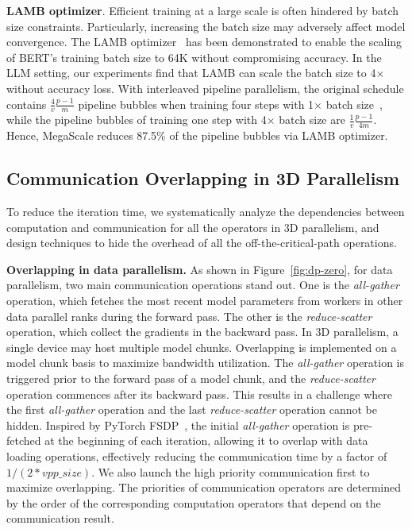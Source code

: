 \documentclass[letterpaper,twocolumn,10pt]{article}
\newcommand{\parabf}[1]{\medskip\noindent\textbf{#1}}
\newcommand{\sysname}{MegaScale\xspace}
\begin{document}
\parabf{LAMB optimizer}. Efficient training at a large scale is often
hindered by batch size constraints. Particularly, increasing the batch size may
adversely affect model convergence. The LAMB optimizer~\cite{You2020Large} has been
demonstrated to enable the scaling of BERT's training batch size to 64K without
compromising accuracy. In the LLM setting, our experiments find that LAMB
can scale the batch size to 4$\times$ without accuracy loss. With
interleaved pipeline parallelism, the original schedule contains $\frac{4}{v}
\frac{p-1}{m}$ pipeline bubbles when training four steps with 1$\times$ batch
size~\cite{narayanan2021efficient}, while the pipeline bubbles of training one
step with 4$\times$ batch size are $\frac{1}{v} \frac{p-1}{4m}$. Hence, {\sysname}
reduces 87.5\% of the pipeline bubbles via LAMB optimizer. 

\subsection{Communication Overlapping in 3D Parallelism}
\label{sec:overlap}

To reduce the iteration time, we systematically analyze the dependencies between
computation and communication for all the operators in 3D parallelism, and
design techniques to hide the overhead of all the off-the-critical-path
operations.

\parabf{Overlapping in data parallelism.} 
As shown in Figure~\ref{fig:dp-zero}, for data parallelism, two main
communication operations stand out. One is the \textit{all-gather} operation,
which fetches the most recent model parameters from workers in other data
parallel ranks during the forward pass. The other is the \textit{reduce-scatter}
operation, which collect the gradients in the backward pass. In 3D parallelism,
a single device may host multiple model chunks. Overlapping is implemented on a
model chunk basis to maximize bandwidth utilization. The \textit{all-gather}
operation is triggered prior to the forward pass of a model chunk, and the
\textit{reduce-scatter} operation commences after its backward pass. This
results in a challenge where the first \textit{all-gather} operation and the
last \textit{reduce-scatter} operation cannot be hidden. Inspired by PyTorch
FSDP~\cite{pytorch_fsdp}, the initial \textit{all-gather} operation is
pre-fetched at the beginning of each iteration, allowing it to overlap with data
loading operations, effectively reducing the communication time by a factor of
$1/(2*vpp\_size)$.
We also launch the high priority communication first to maximize overlapping. The priorities of communication operators are determined by the order of the corresponding computation operators that depend on the communication result. 
\end{document}
